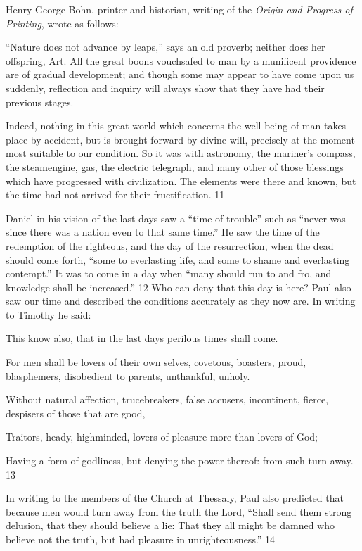 Henry George Bohn, printer and historian, writing of the \textit{Origin and Progress of Printing},
wrote as follows:

``Nature does not advance by leaps,'' says an old proverb; neither does her offspring, Art. All
the great boons vouchsafed to man by a munificent providence are of gradual development;
and though some may appear to have come upon us suddenly, reflection and inquiry will
always show that they have had their previous stages.

Indeed, nothing in this great world which concerns the well-being of man takes place by
accident, but is brought forward by divine will, precisely at the moment most suitable to our
condition. So it was with astronomy, the mariner's compass, the steamengine, gas, the
electric telegraph, and many other of those blessings which have progressed with civilization.
The elements were there and known, but the time had not arrived for their fructification. 11

Daniel in his vision of the last days saw a ``time of trouble'' such as ``never was since there
was a nation even to that same time.'' He saw the time of the redemption of the righteous, and
the day of the resurrection, when the dead should come forth, ``some to everlasting life, and
some to shame and everlasting contempt.'' It was to come in a day when ``many should run to
and fro, and knowledge shall be increased.'' 12 Who can deny that this day is here? Paul also
saw our time and described the conditions accurately as they now are. In writing to Timothy
he said:

This know also, that in the last days perilous times shall come.

For men shall be lovers of their own selves, covetous, boasters, proud, blasphemers,
disobedient to parents, unthankful, unholy.

Without natural affection, trucebreakers, false accusers, incontinent, fierce, despisers of those
that are good,

Traitors, heady, highminded, lovers of pleasure more than lovers of God;

Having a form of godliness, but denying the power thereof: from such turn away. 13

In writing to the members of the Church at Thessaly, Paul also predicted that because men
would turn away from the truth the Lord, ``Shall send them strong delusion, that they should
believe a lie: That they all might be damned who believe not the truth, but had pleasure in
unrighteousness.'' 14

